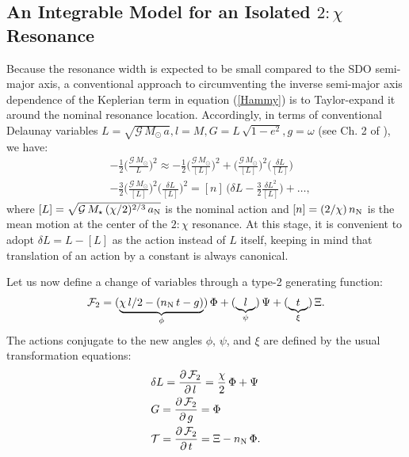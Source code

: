 \documentclass[twocolumn]{aastex62}
\newcommand{\G}{\mathcal{G}}
\newcommand{\M}{M_{\star}}
\newcommand{\Msun}{M_{\odot}}
\newcommand{\an}{a_{\rm{N}}}
\begin{document}
\subsection{An Integrable Model for an Isolated $2:\chi$ Resonance} \label{sec:intmod}
Because the resonance width is expected to be small compared to the SDO semi-major axis, a conventional approach to circumventing the inverse semi-major axis dependence of the Keplerian term in equation (\ref{Hammy}) is to Taylor-expand it around the nominal resonance location. Accordingly, in terms of conventional Delaunay variables $L=\sqrt{\G\,\Msun\,a}, l=M, G=L\,\sqrt{1-e^2}, g=\omega$ (see Ch. 2 of \citealt{MD99}), we have:
\begin{align}
&-\frac{1}{2}\bigg(\frac{\G\,\Msun}{L} \bigg)^2 \approx -\frac{1}{2}\bigg(\frac{\G\,\Msun}{[L]} \bigg)^2 + \bigg(\frac{\G\,\Msun}{[L]} \bigg)^2 \bigg( \frac{\delta L}{[L]} \bigg) \nonumber \\
& - \frac{3}{2} \bigg(\frac{\G\,\Msun}{[L]} \bigg)^2 \bigg( \frac{\delta L}{[L]} \bigg)^2 =[n]\,\bigg(\delta L - \frac{3}{2}\frac{\delta L^2}{[L]} \bigg)+\dots ,
\label{Hkeptaylor}
\end{align}
where $[L]=\sqrt{\G\,\M\,(\chi/2)^{2/3}\,\an}$ is the nominal action and $[n]=(2/\chi)\,n_{\rm{N}}$ is the mean motion at the center of the $2:\chi$ resonance. At this stage, it is convenient to adopt $\delta L=L-[L]$ as the action instead of $L$ itself, keeping in mind that translation of an action by a constant is always canonical. 

Let us now define a change of variables through a type-2 generating function:
\begin{align}
\mathcal{F}_2=(\underbrace{\chi\,l/2-(n_{\rm{N}}\,t-g)}_{\phi})\,\Phi+(\underbrace{l}_{\psi})\,\Psi+(\underbrace{t}_{\xi})\,\Xi.
\label{Hkeptaylor}
\end{align}
The actions conjugate to the new angles $\phi$, $\psi$, and $\xi$ are defined by the usual transformation equations:
\begin{align}
&\delta L=\frac{\partial\,\mathcal{F}_2}{\partial\,l}=\frac{\chi}{2}\,\Phi+\Psi \nonumber \\
&G=\frac{\partial\,\mathcal{F}_2}{\partial\,g}=\Phi \nonumber \\
&\mathcal{T}=\frac{\partial\,\mathcal{F}_2}{\partial\,t}=\Xi-n_{\rm{N}}\,\Phi.
\label{transform}
\end{align}
\end{document}
